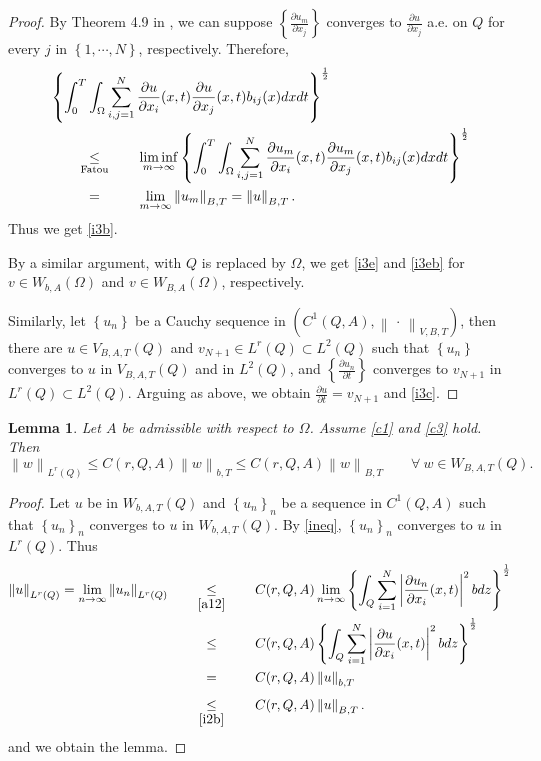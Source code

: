 \documentclass[11pt, a4paper]{article}
\newtheorem{lemma}[theorem]{Lemma}
\numberwithin{equation}{section}
\newcommand{\coex}[2][\hphantom{longexplanation}]{%
  \underset{{#1}}{\overset{\hphantom{longexplanation}}{#2}}
}
\newcommand{\abs}[1]{\left\lvert #1\right\rvert}
\newcommand{\norm}[1]{\left\lVert #1\right\rVert}
\begin{document}
\begin{proof}
By Theorem 4.9 in \cite[p.94]{brezisFunctionalAnalysisSobolev2011}, we
can suppose  $\displaystyle\left\{\frac{\partial u_{m}}{\partial
    x_{j}}\right\}$  converges  to  $\displaystyle \frac{\partial
  u}{\partial x_{j}}$ a.e. on $Q$ for every $j$ in
$\left\{1,\cdots,N\right\}$, respectively. Therefore,
\begin{align*}
&\left\{\int_{0}^{T}\int_{\Omega} \sum_{i,j=1}^{N}\frac{\partial
  u}{\partial x_{i}}(x,t)\frac{\partial u}{\partial
  x_{j}}(x,t)b_{ij}(x)dxdt\right\}^{\frac{1}{2}}\\
&\coex[\text{Fatou}]{\le}
  \liminf_{m\to\infty}\left\{\int_{0}^{T}\int_{\Omega}\sum_{i,j=1}^{N}\frac{\partial
  u_{m}}{\partial x_{i}}(x,t)\frac{\partial u_{m}}{\partial
  x_{j}}(x,t)b_{ij}(x)dxdt\right\}^{\frac{1}{2}}\\
  &\coex{=}\lim_{m\to\infty}\norm{u_{m}}_{B,T}=\norm{u}_{B,T}. 
\end{align*}
Thus we get \eqref{i3b}.

By a similar argument, with $Q$ is replaced by $\Omega$, we get
\eqref{i3e} and \eqref{i3eb} for $v \in W_{b,A}(\Omega)$ and $v \in
W_{B,A}(\Omega)$, respectively.

Similarly, let $\left\{u_{n}\right\}$  be a
 Cauchy sequence in $\left(C^{1}(Q,A),\norm{\,\cdot\,}_{V,B,T} \right)$, then
 there are $u\in V_{B,A,T}(Q)$ and  $v_{N+1}\in L^{r}(Q)\subset
 L^{2}(Q)$ such that $\left\{u_{n}\right\}$  converges to  $u$ in
 $V_{B,A,T}(Q)$ and in $L^{2}(Q)$, and
 $\displaystyle\left\{\frac{\partial u_{n}}{\partial t} \right\}$
 converges to $v_{N+1}$ in $L^{r}(Q)\subset L^{2}(Q) $. Arguing as
 above,  we obtain $\displaystyle\frac{\partial u}{\partial
   t}=v_{N+1}$ and \eqref{i3c}.
 \end{proof} 
  \begin{lemma} Let $A$ be  admissible with respect to $\Omega$. Assume \eqref{c1} and \eqref{c3} hold. Then 
 \begin{equation}\norm{w}_{L^{r}(Q)}\le C(r,Q,A)\norm{w}_{b,T}\le C(r,Q,A)\norm{w}_{B,T}\qquad\forall~ w\in W_{B,A,T}(Q).
\label{cb}
\end{equation}
  \label{4l2b}
  \end{lemma}
  \begin{proof}
 Let $u$ be in $W_{b,A,T}(Q)$ and $\left\{u_{n}\right\}_{n}$ be a sequence in $C^{1}(Q,A)$ such that $\left\{u_{n}\right\}_{n}$ converges to $u$ in $W_{b ,A,T}(Q)$. By \eqref{ineq}, $\left\{u_{n}\right\}_{n}$ converges to $u$ in $L^{r}(Q)$. Thus
 \begin{align*}
 \norm{u}_{L^{r}(Q)}= \lim_{n\to \infty}\norm{u_{n}}_{L^{r}(Q)}
   &\coex[\eqref{a12}]{\le} C(r,Q,A)\lim_{n\to \infty}\left\{\int_{Q}
     \sum_{i=1}^{N} \abs{\frac{\partial u_{n}}{\partial x_i}
     (x,t)}^{2}bdz\right\}^{\frac{1}{2}}\\
   &\coex{\le}  C(r,Q,A)\left\{\int_{Q} \sum_{i=1}^{N}
     \abs{\frac{\partial u}{\partial x_i}
     (x,t)}^{2}bdz\right\}^{\frac{1}{2}}\\
   &\coex{=} C(r,Q,A)\norm{u}_{b,T}\\
   &\coex[\eqref{i2b}]{\le} C(r,Q,A)\norm{u}_{B,T}.
 \end{align*}
and we obtain the lemma.
 \end{proof} 
\end{document}
